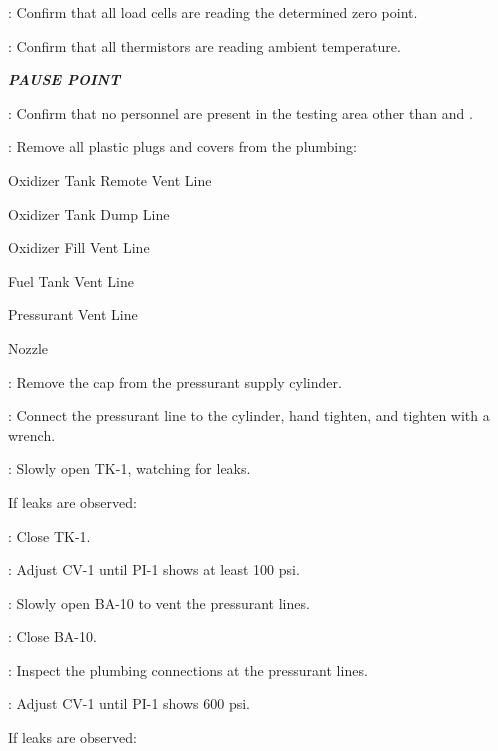 \begin{checklist}
    \item \daq{}: Confirm that all load cells are reading the determined zero point.
    \item \daq{}: Confirm that all thermistors are reading ambient temperature.
    \item \textbf{\textit{PAUSE POINT}}
    \item \secondary{}: Confirm that no personnel are present in the testing area other than \primary{} and \secondary{}.
    \item \primary{}: Remove all plastic plugs and covers from the plumbing:
    \begin {checklist}
        \item Oxidizer Tank Remote Vent Line
        \item Oxidizer Tank Dump Line
        \item Oxidizer Fill Vent Line
        \item Fuel Tank Vent Line
        \item Pressurant Vent Line
        \item Nozzle
    \end {checklist}
    \item \primary{}: Remove the cap from the pressurant supply cylinder.
	\item \primary{}: Connect the pressurant line to the cylinder, hand tighten, and tighten with a wrench.
	\item \primary{}: Slowly open TK-1, watching for leaks.
	\begin{checklist}[label=$\bullet$]
        \item If leaks are observed:
        \begin{checklist}
            \item \primary{}: Close TK-1.
            \item \primary{}: Adjust CV-1 until PI-1 shows at least 100 psi.
            \item \primary{}: Slowly open BA-10 to vent the pressurant lines.
            \item \primary{}: Close BA-10.
            \item \primary{}: Inspect the plumbing connections at the pressurant lines.
        \end{checklist}
    \end{checklist}
    \item \primary{}: Adjust CV-1 until PI-1 shows 600 psi.
	\begin{checklist}[label=$\bullet$]
        \item If leaks are observed:

\end{checklist}
\end{checklist}
